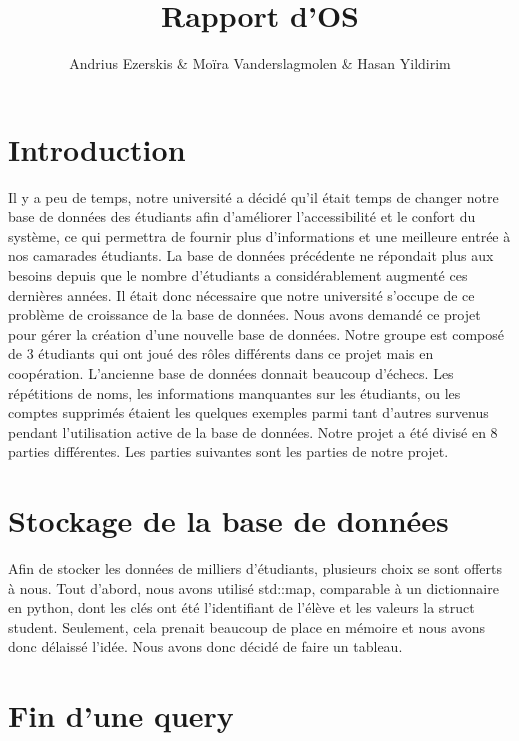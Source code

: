 \documentclass[utf8]{article}
\begin{document}
\begin{titlepage}
    

\author{Andrius Ezerskis \& Moïra Vanderslagmolen \& Hasan Yildirim}
\title{Rapport d'OS}

\maketitle
\end{titlepage}

\section{Introduction}
\par
Il y a peu de temps, notre université a décidé qu'il était temps de changer notre base de données des étudiants afin d'améliorer l'accessibilité et le confort du système, ce qui permettra de fournir plus d'informations et une meilleure entrée à nos camarades étudiants. La base de données précédente ne répondait plus aux besoins depuis que le nombre d'étudiants a considérablement augmenté ces dernières années. Il était donc nécessaire que notre université s'occupe de ce problème de croissance de la base de données.
Nous avons demandé ce projet pour gérer la création d'une nouvelle base de données. Notre groupe est composé de 3 étudiants qui ont joué des rôles différents dans ce projet mais en coopération. L'ancienne base de données donnait beaucoup d'échecs. Les répétitions de noms, les informations manquantes sur les étudiants, ou les comptes supprimés étaient les quelques exemples parmi tant d'autres survenus pendant l'utilisation active de la base de données. Notre projet a été divisé en 8 parties différentes. Les parties suivantes sont les parties de notre projet.
\par


\section{Stockage de la base de données}
\indent{}
\par
Afin de stocker les données de milliers d'étudiants, plusieurs choix se sont offerts à nous. 
Tout d'abord, nous avons utilisé std::map, comparable à un dictionnaire en python, dont les
clés ont été l'identifiant de l'élève et les valeurs la struct student. Seulement, cela
prenait beaucoup de place en mémoire et nous avons donc délaissé l'idée. Nous avons donc décidé de faire un tableau.
\par
\section{Fin d'une query}
\end{document}

